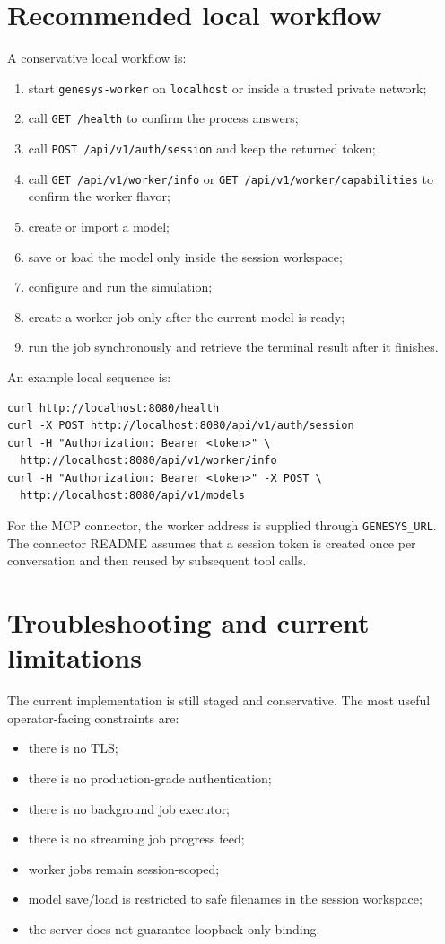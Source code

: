 \section{Recommended local workflow}
\label{sec:worker-local-workflow}

A conservative local workflow is:
\begin{enumerate}
\item start \texttt{genesys-worker} on \texttt{localhost} or inside a trusted
private network;
\item call \texttt{GET /health} to confirm the process answers;
\item call \texttt{POST /api/v1/auth/session} and keep the returned token;
\item call \texttt{GET /api/v1/worker/info} or
\texttt{GET /api/v1/worker/capabilities} to confirm the worker flavor;
\item create or import a model;
\item save or load the model only inside the session workspace;
\item configure and run the simulation;
\item create a worker job only after the current model is ready;
\item run the job synchronously and retrieve the terminal result after it
finishes.
\end{enumerate}

An example local sequence is:
\begin{verbatim}
curl http://localhost:8080/health
curl -X POST http://localhost:8080/api/v1/auth/session
curl -H "Authorization: Bearer <token>" \
  http://localhost:8080/api/v1/worker/info
curl -H "Authorization: Bearer <token>" -X POST \
  http://localhost:8080/api/v1/models
\end{verbatim}

For the MCP connector, the worker address is supplied through
\texttt{GENESYS\_URL}. The connector README assumes that a session token is
created once per conversation and then reused by subsequent tool calls.

\section{Troubleshooting and current limitations}
\label{sec:worker-troubleshooting}

The current implementation is still staged and conservative. The most useful
operator-facing constraints are:
\begin{itemize}
\item there is no TLS;
\item there is no production-grade authentication;
\item there is no background job executor;
\item there is no streaming job progress feed;
\item worker jobs remain session-scoped;
\item model save/load is restricted to safe filenames in the session workspace;
\item the server does not guarantee loopback-only binding.
\end{itemize}

